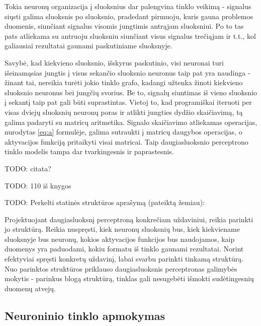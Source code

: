 \documentclass{VUMIFPSbakalaurinis}
\newcommand{\TODO}[1]{
\colorbox{todo-background-color}{TODO: #1}
}
\begin{document}
Tokia neuronų organizacija į sluoksnius dar palengvina tinklo veikimą - signalus siųsti galima sluoksnis po sluoksnio, pradedant pirmuoju, kuris gauna problemos duomenis, siunčiant signalus visomis jungtimis antrąjam sluoksniui.
Po to tas pats atliekama su antruoju sluoksniu siunčiant visus signalus trečiąjam ir t.t., kol galiausiai rezultatai gaunami paskutiniame sluoksnyje.

Savybė, kad kiekvieno sluoksnio, išskyrus paskutinio, visi neuronai turi išeinamąsias jungtis į visus sekančio sluoksnio neuronus taip pat yra naudinga - žinant tai, nereikia turėti jokio tinklo grafo, kadangi užtenka žinoti kiekvieno sluoksnio neuronus bei jungčių svorius.
Be to, signalų siuntimas iš vieno sluoksnio į sekantį taip pat gali būti suprastintas.
Vietoj to, kad programiškai iteruoti per visas dviejų sluoksnių neuronų poras ir atlikti jungties dydžio skaičiavimą, tą galima padaryti su matricų aritmetika.
Signalo skaičiavimo atliekamas operacijas, nurodytas \ref{eq:a} formulėje, galima sutraukti į matricų daugybos operacijas, o aktyvacijos funkciją pritaikyti visai matricai.
Taip daugiasluoksnio perceptrono tinklo modelis tampa dar tvarkingesnis ir paprastesnis.


\TODO{citata?}

\TODO{110 iš knygos}

\TODO{Perkelti statinės struktūros aprašymą (pateiktą žemiau):}

Projektuojant daugiasluoksnį perceptroną konkrečiam uždaviniui, reikia parinkti jo struktūrą.
Reikia nuspręsti, kiek neuronų sluoksnių bus, kiek kiekviename sluoksnyje bus neuronų, kokios aktyvacijos funkcijos bus naudojamos, kaip duomenys yra paduodami, kokiu formatu iš tinklo gaunami rezultatai.
Norint efektyviai spręsti konkretų uždavinį, labai svarbu parinkti tinkamą struktūrą.
Nuo parinktos struktūros priklauso daugiasluoksnis perceptronas galimybės mokytis - parinkus blogą struktūrą, tinklas gali nesugebėti išmokti sudėtingesnių duomenų atvejų.



\subsection{Neuroninio tinklo apmokymas} \label{network-learning}

\end{document}
